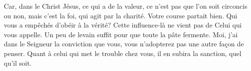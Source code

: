 Car, dans le Christ Jésus,
	ce qui a de la valeur, ce n’est pas que l’on soit circoncis ou non,
	mais c’est la foi, qui agit par la charité.
Votre course partait bien.
		Qui vous a empêchés d’obéir à la vérité?
Cette influence-là ne vient pas de Celui qui vous appelle.
Un peu de levain suffit pour que toute la pâte fermente.
Moi, j’ai dans le Seigneur la conviction
		que vous, vous n’adopterez pas une autre façon de penser.
Quant à celui qui met le trouble chez vous, il en subira la sanction, quel qu’il soit.
